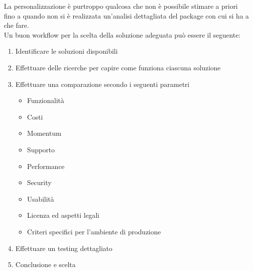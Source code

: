 La personalizzazione è purtroppo qualcosa che non è possibile stimare a priori fino a quando non si è realizzata un'analisi dettagliata del package con cui si ha a che fare. \\
Un buon workflow per la scelta della soluzione adeguata può essere il seguente:
\begin{enumerate}
\item Identificare le soluzioni disponibili
\item Effettuare delle ricerche per capire come funziona ciascuna soluzione
\item Effettuare una comparazione secondo i seguenti parametri
\begin{itemize}
\item Funzionalità
\item Costi
\item Momentum
\item Supporto
\item Performance
\item Security
\item Usabilità
\item Licenza ed aspetti legali
\item Criteri specifici per l'ambiente di produzione
\end{itemize}
\item Effettuare un testing dettagliato
\item Conclusione e scelta
\end{enumerate}